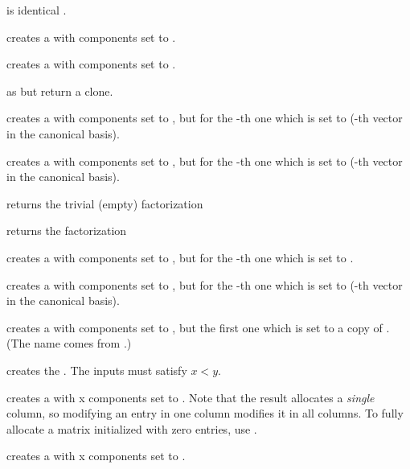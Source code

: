  is identical .

 creates a  with  components set to
.

 creates a  with  components set to
.

 as  but return a clone.

 creates a  with  components
set to , but for the -th one which is set to 
(-th vector in the canonical basis).

 creates a  with  components
set to , but for the -th one which is set to 
(-th vector in the canonical basis).

 returns the trivial (empty) factorization

 returns the factorization

 creates a  with 
components set to , but for the -th one which is set to
.

 creates a  with 
components set to , but for the -th one which is set to
 (-th vector in the canonical basis).

 creates a  with 
components set to , but the first one which is set to a copy
of . (The name comes from .)

\smallskip

 creates the  .
The inputs must satisfy $x < y$.

 creates a  with  x 
components set to . Note that the result allocates a
\emph{single} column, so modifying an entry in one column modifies it in
all columns. To fully allocate a matrix initialized with zero entries,
use .

 creates a  with  x
 components set to .

